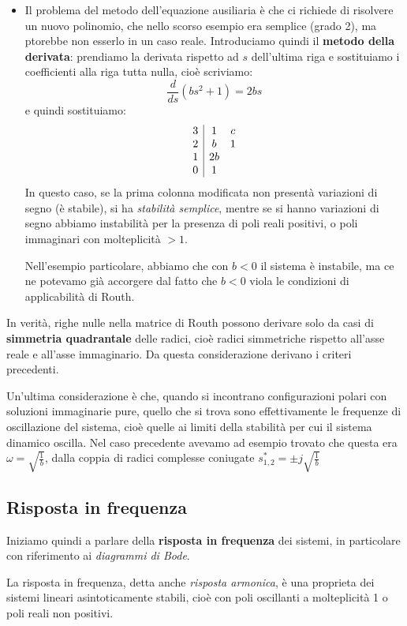 \documentclass[a4paper,11pt]{article}
\begin{document}
\begin{itemize}
\begin{itemize}
	\item Il problema del metodo dell'equazione ausiliaria è che ci richiede di risolvere un nuovo polinomio, che nello scorso esempio era semplice (grado 2), ma ptorebbe non esserlo in un caso reale.
Introduciamo quindi il \textbf{metodo della derivata}: prendiamo la derivata rispetto ad $s$ dell'ultima riga e sostituiamo i coefficienti alla riga tutta nulla, cioè scriviamo:
$$
\frac{d}{ds} \left( bs^2 + 1 \right) = 2bs
$$
e quindi sostituiamo:
$$
\begin{array}{c | c c}
	3 & 1 & c \\
	2 & b & 1 \\
	1 & 2b \\
	0 & 1
\end{array}
$$
In questo caso, se la prima colonna modificata non presentà variazioni di segno (è stabile), si ha \textit{stabilità semplice}, mentre se si hanno variazioni di segno abbiamo instabilità per la presenza di poli reali positivi, o poli immaginari con molteplicità $> 1$.

Nell'esempio particolare, abbiamo che con $b<0$ il sistema è instabile, ma ce ne potevamo già accorgere dal fatto che $b<0$ viola le condizioni di applicabilità di Routh.
\end{itemize}

In verità, righe nulle nella matrice di Routh possono derivare solo da casi di \textbf{simmetria quadrantale} delle radici, cioè radici simmetriche rispetto all'asse reale e all'asse immaginario.
Da questa considerazione derivano i criteri precedenti.

Un'ultima considerazione è che, quando si incontrano configurazioni polari con soluzioni immaginarie pure, quello che si trova sono effettivamente le frequenze di oscillazione del sistema, cioè quelle ai limiti della stabilità per cui il sistema dinamico oscilla.
Nel caso precedente avevamo ad esempio trovato che questa era $\omega = \sqrt{\frac{1}{b}}$, dalla coppia di radici complesse coniugate $s^*_{1, 2} = \pm j \sqrt{ \frac{1}{b} }$

\end{itemize}

\subsection{Risposta in frequenza}
Iniziamo quindi a parlare della \textbf{risposta in frequenza} dei sistemi, in particolare con riferimento ai \textit{diagrammi di Bode}.

La risposta in frequenza, detta anche \textit{risposta armonica}, è una proprieta dei sistemi lineari asintoticamente stabili, cioè con poli oscillanti a molteplicità 1 o poli reali non positivi.
\end{document}
